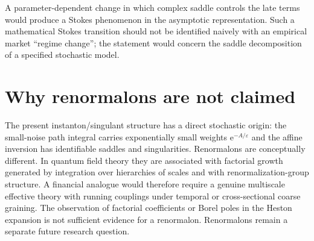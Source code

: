\documentclass[11pt]{article}
\newcommand{\e}{\mathrm e}
\begin{document}
A parameter-dependent change in which complex saddle controls the late terms would produce a Stokes phenomenon in the asymptotic representation. Such a mathematical Stokes transition should not be identified naively with an empirical market ``regime change''; the statement would concern the saddle decomposition of a specified stochastic model.

\section{Why renormalons are not claimed}
The present instanton/singulant structure has a direct stochastic origin: the small-noise path integral carries exponentially small weights $\e^{-A/\varepsilon}$ and the affine inversion has identifiable saddles and singularities. Renormalons are conceptually different. In quantum field theory they are associated with factorial growth generated by integration over hierarchies of scales and with renormalization-group structure. A financial analogue would therefore require a genuine multiscale effective theory with running couplings under temporal or cross-sectional coarse graining. The observation of factorial coefficients or Borel poles in the Heston expansion is not sufficient evidence for a renormalon. Renormalons remain a separate future research question.
\end{document}
